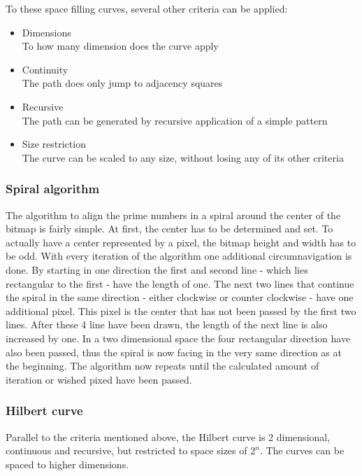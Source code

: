 To these space filling curves, several other criteria can be applied:
\begin{itemize}%
   \item Dimensions\\
      To how many dimension does the curve apply
   \item Continuity\\
      The path does only jump to adjacency squares
   \item Recursive\\
      The path can be generated by recursive application of a simple pattern
   \item Size restriction\\
      The curve can be scaled to any size, without losing any of its other criteria
\end{itemize}%

\subsubsection{Spiral algorithm}
The algorithm to align the prime numbers in a spiral around the center of the bitmap is fairly simple. At first, the center has to be determined and set. To actually have a center represented by a pixel, the bitmap height and width has to be odd. With every iteration of the algorithm one additional circumnavigation is done. By starting in one direction the first and second line - which lies rectangular to the first - have the length of one. The next two lines that continue the spiral in the same direction - either clockwise or counter clockwise - have one additional pixel. This pixel is the center that has not been passed by the first two lines. After these 4 line have been drawn, the length of the next line is also increased by one. In a two dimensional space the four rectangular direction have also been passed, thus the spiral is now facing in the very same direction as at the beginning. The algorithm now repeats until the calculated amount of iteration or wished pixed have been passed.

\subsubsection{Hilbert curve}
Parallel to the criteria mentioned above, the Hilbert curve is 2 dimensional, continuous and recursive, but restricted to space sizes of $2^{n}$. The curves can be spaced to higher dimensions.

